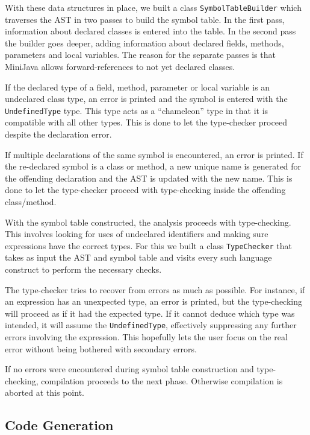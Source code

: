 \documentclass[a4paper,11pt]{article}
\begin{document}
With these data structures in place, we built a class \texttt{SymbolTableBuilder}
which traverses the AST in two passes to build the symbol table. In the first pass,
information about declared classes is entered into the table. In the second pass the
builder goes deeper, adding information about declared fields, methods, parameters
and local variables. The reason for the separate passes is that MiniJava allows
forward-references to not yet declared classes.

If the declared type of a field, method, parameter or local variable is an undeclared
class type, an error is printed and the symbol is entered with the \texttt{UndefinedType}
type. This type acts as a ``chameleon'' type in that it is compatible with all other
types. This is done to let the type-checker proceed despite the declaration error.

If multiple declarations of the same symbol is encountered, an error is printed.
If the re-declared symbol is a class or method, a new unique name is generated for
the offending declaration and the AST is updated with the new name. This is done to
let the type-checker proceed with type-checking inside the offending class/method.

With the symbol table constructed, the analysis proceeds with type-checking. This
involves looking for uses of undeclared identifiers and making sure expressions
have the correct types. For this we built a class \texttt{TypeChecker} that takes as
input the AST and symbol table and visits every such language construct to perform
the necessary checks.

The type-checker tries to recover from errors as much as possible. For instance,
if an expression has an unexpected type, an error is printed, but the type-checking
will proceed as if it had the expected type. If it cannot deduce which type was
intended, it will assume the \texttt{UndefinedType}, effectively suppressing any
further errors involving the expression. This hopefully lets the user focus on the
real error without being bothered with secondary errors.

If no errors were encountered during symbol table construction and type-checking,
compilation proceeds to the next phase. Otherwise compilation is aborted at this point.

\subsection{Code Generation}
\end{document}
